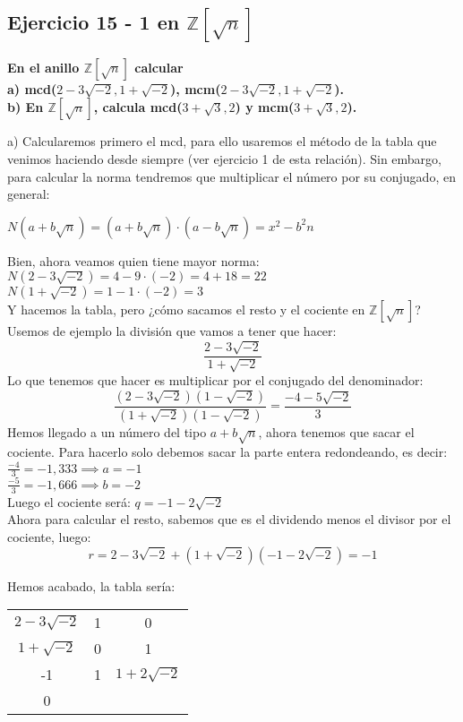 \documentclass[11pt, a4paper, titlepage]{article}
\providecommand{\ent}{\mathbb{Z}}
\begin{document}
\subsection{\LARGE{Ejercicio 15 - 1 en $\ent [\sqrt{n}]$}}

\textbf{En el anillo $\ent [\sqrt{n}]$ calcular \\
	a) mcd($2-3\sqrt{-2},1+\sqrt{-2}$), mcm($2-3\sqrt{-2},1+\sqrt{-2}$).\\
	b) En $\ent [\sqrt{n}]$, calcula mcd($3+\sqrt{3},2$) y mcm($3+\sqrt{3},2$).}
	
a) Calcularemos primero el mcd, para ello usaremos el método de la tabla que venimos haciendo
desde siempre (ver ejercicio 1 de esta relación). Sin embargo, para calcular la norma tendremos
que multiplicar el número por su conjugado, en general:

$N(a+b\sqrt{n}) = (a+b\sqrt{n}) \cdot (a-b\sqrt{n}) = x^{2} - b^{2}n $

Bien, ahora veamos quien tiene mayor norma: \\
$ N(2-3\sqrt{-2}) = 4 - 9 \cdot (-2) = 4 + 18 = 22 $ \\
$ N(1+\sqrt{-2}) = 1 - 1 \cdot (-2) = 3 $ \\

Y hacemos la tabla, pero ¿cómo sacamos el resto y el cociente en $\ent[\sqrt{n}]$? Usemos de ejemplo la división
que vamos a tener que hacer:
$$ \frac{2-3\sqrt{-2}}{1+\sqrt{-2}} $$
Lo que tenemos que hacer es multiplicar por el conjugado del denominador:
$$ \frac{(2-3\sqrt{-2})(1-\sqrt{-2})}{(1+\sqrt{-2})(1-\sqrt{-2})} = \frac{-4-5\sqrt{-2}}{3} $$
Hemos llegado a un número del tipo $a+b\sqrt{n}$, ahora tenemos que sacar el cociente. Para hacerlo
solo debemos sacar la parte entera redondeando, es decir: \\
$ \frac{-4}{3} = -1,333 \implies a = -1 $ \\
$ \frac{-5}{3} = -1,666 \implies b = -2 $ \\
Luego el cociente será: $ q = -1-2\sqrt{-2} $ \\
Ahora para calcular el resto, sabemos que es el dividendo menos el divisor por el cociente, luego:
$$ r = 2-3\sqrt{-2} + (1+\sqrt{-2})(-1-2\sqrt{-2}) = -1 $$

Hemos acabado, la tabla sería:

\begin{center}
\begin{tabular}{c|cc}
$ 2-3\sqrt{-2} $ & 1 & 0 \\
$ 1+\sqrt{-2} $ & 0 & 1 \\
\hline
-1 & 1 & $ 1+2\sqrt{-2}$ \\
\hline
0
\end{tabular}
\end{center}
\end{document}
